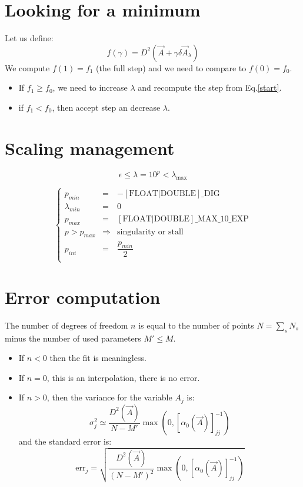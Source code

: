 \documentclass[aps,12pt]{revtex4}
\begin{document}
\section{Looking for a minimum}
Let us define:
\begin{equation}
	f(\gamma)  =  D^2(\vec{A}+\gamma \delta\vec{A}_\lambda)
\end{equation}
We compute $f(1)=f_1$ (the full step) and we need to compare to $f(0)=f_0$.
\begin{itemize}
\item If $f_1\geq f_0$, we need to increase $\lambda$ and recompute the step from Eq.\eqref{start}.
\item if $f_1<f_0$, then accept step an decrease $\lambda$.
\end{itemize}

\section{Scaling management}

\begin{equation}
	\epsilon \leq \lambda = 10^p < \lambda_{\max}
\end{equation}

\begin{equation}
\left\lbrace
\begin{array}{lcl}
	p_{min}  & =  &-\mathrm{[FLOAT|DOUBLE]\_DIG}\\
	\lambda_{min} & = & 0\\
 	\hline
	p_{max} & = &  \mathrm{[FLOAT|DOUBLE]\_MAX\_10\_EXP}\\
	p>p_{max}& \Rightarrow & \text{singularity or stall}\\
	\hline
	p_{ini} & = & \dfrac{p_{min}}{2}\\
\end{array}
\right.
\end{equation}

\section{Error computation}
The number of degrees of freedom $n$ is equal to the number of points $N=\sum_s N_s$ minus the number of used parameters $M'\leq M$.
\begin{itemize}
\item If $n<0$ then the fit is meaningless.
\item If $n=0$, this is an interpolation, there is no error.
\item If $n>0$, then the variance for the variable $A_j$ is:
\begin{equation}
	\sigma^2_j \simeq \dfrac{D^2(\vec{A})}{N-M'} \max\left(0,\left[\alpha_0(\vec{A})\right]^{-1}_{jj}\right)
\end{equation}
and the standard error is:
\begin{equation}
	\mathrm{err}_j = \sqrt{\dfrac{D^2(\vec{A})}{\left(N-M'\right)^2} \max\left(0,\left[\alpha_0(\vec{A})\right]^{-1}_{jj}\right) }
\end{equation}

\end{itemize}
\end{document}
